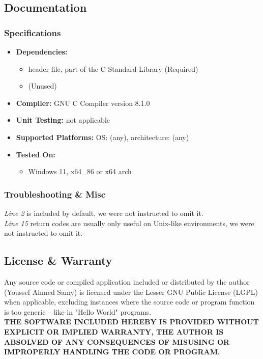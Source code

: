 \documentclass[a4paper,11pt]{article}
\theoremstyle{mytheor}
\begin{document}
\subsection{Documentation}
\subsubsection{Specifications}
\begin{itemize}
    \item \textbf{Dependencies:}
    \begin{itemize}
        \item \texttt{\color{inlinecode}{stdio.h}} header file, part of the C Standard Library (Required)
        \item \texttt{\color{inlinecode}{stdlib.h}} (Unused)
    \end{itemize}
    \item \textbf{Compiler:} GNU C Compiler \texttt{\color{inlinecode}{(gcc)}} version 8.1.0
    \item \textbf{Unit Testing:} not applicable
    \item \textbf{Supported Platforms:} OS: (any), architecture: (any)
    \item \textbf{Tested On:}
    \begin{itemize}
        \item Windows 11, x64\_86 or x64 arch
    \end{itemize}
\end{itemize}
\subsubsection{Troubleshooting \& Misc}
\textit{Line 2} is included by default, we were not instructed to omit it.\\
\textit{Line 15} return codes are usually only useful on Unix-like environments, we were not instructed to omit it.
\subsection{License \& Warranty}
Any source code or compiled application included or distributed by the author (Youssef Ahmed Samy) is licensed under the Lesser GNU Public License (LGPL) when applicable, excluding instances where the source code or program function is too generic -- like in "Hello World" programs.\\
\textbf{THE SOFTWARE INCLUDED HEREBY IS PROVIDED WITHOUT EXPLICIT OR IMPLIED WARRANTY, THE AUTHOR IS ABSOLVED OF ANY CONSEQUENCES OF MISUSING OR IMPROPERLY HANDLING THE CODE OR PROGRAM.}
\tableofcontents
\end{document}
